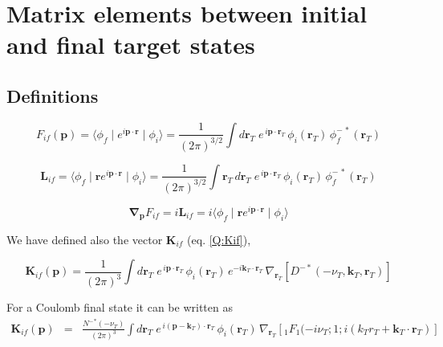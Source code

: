 \chapter{Matrix elements between initial and final target states}

\section{Definitions}
\label{S:definitions}


\label{S:FGKL-if}

\begin{equation}\label{Q:Fif-def}
  F_{if}(\bm{p}) = \langle \phi_{f}\mid e^{i \bm{p}\cdot \bm{r}}\mid \phi_{i} \rangle = \frac{1}{(2 \pi)^{3/2}} \int d  \bm{r}_{T} \; e^{\, i \bm{p} \cdot \bm{r}_{T}} \, \phi_{i}(\bm{r}_{T}) \, \phi^{-\, \ast}_{f}(\bm{r}_T)
\end{equation}

\begin{equation}\label{Q:Lif-def}
\bm{L}_{if} = \langle \phi_{f}\mid  \bm{r} e^{i \bm{p}\cdot
\bm{r}}\mid \phi_{i} \rangle = \frac{1}{(2 \pi)^{3/2}} \int \bm{r}_{T}
\, d \bm{r}_{T} \; e^{\, i \bm{p} \cdot \bm{r}_{T}} \,
\phi_{i}(\bm{r}_{T}) \,
 \phi^{-\, \ast}_{f}(\bm{r}_T)
\end{equation}

\begin{equation}\label{Q:Fif-Lif-relat}
\bm{\nabla}_{\bm{p}} F_{if} = i \bm{L}_{if} =i \langle \phi_{f}\mid  \bm{r}
e^{i \bm{p}\cdot \bm{r}}\mid \phi_{i} \rangle
\end{equation}
%

We have defined also the vector $\bm{K}_{if}$ (eq. \ref{Q:Kif}),

\begin{equation}\label{Q:Kif-def}
  \bm{K}_{if}(\bm{p})= \frac{1}{(2 \pi)^{3}} \int d \bm{r}_{T} \;
e^{\, i \bm{p} \cdot \bm{r}_{T}} \, \phi_{i}(\bm{r}_{T}) \,
e^{- i \bm{k}_{T} \cdot \bm{r}_{T}} \,\nabla_{\bm{r}_{T}} \left[
D^{-*}(-\nu_{T},\bm{k}_{T},\bm{r}_{T}) \right]
\end{equation}

For a Coulomb final state it can be written as
\begin{eqnarray*}
\bm{K}_{if}(\bm{p}) &=& \frac{{N^{-}}^{*}(-\nu_{T})}{(2 \pi)^{3}} \int
d \bm{r}_{T} \; e^{\, i \left( \bm{p}- \bm{k}_{T} \right)
\cdot \bm{r}_{T}} \, \phi_{i}(\bm{r}_{T}) \,\nabla_{\bm{r}_{T}} \left[
{_{1}F_{1}}(- i \nu_{T}; 1; i \left( k_{T} r_{T} + \bm{k}_{T}
\cdot
\bm{r}_{T} \right) \right] \nonumber \\
\end{eqnarray*}

